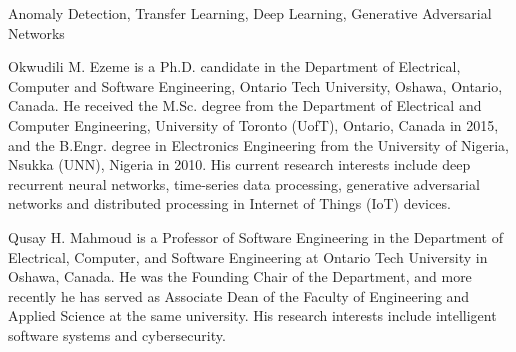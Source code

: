 \documentclass{ieeeaccess}
\begin{document}
\begin{keywords}
Anomaly Detection, Transfer Learning, Deep Learning, Generative Adversarial Networks
\end{keywords}

\titlepgskip=-15pt

\maketitle




\begin{IEEEbiography}{Okwudili M. Ezeme}
	is a Ph.D. candidate in the  Department of Electrical, Computer and Software 
	Engineering, Ontario Tech University, Oshawa,  
	Ontario, Canada. He received the M.Sc. degree from the Department of 
	Electrical and Computer Engineering, University of Toronto (UofT), Ontario, 
	Canada in 2015, and the  B.Engr. degree in Electronics Engineering 
	from the University of Nigeria, Nsukka (UNN), Nigeria in 2010. His current 
	research interests include deep recurrent neural networks, time-series data 
	processing,  generative adversarial networks and distributed processing in Internet of Things (IoT) devices.
\end{IEEEbiography}

\begin{IEEEbiography}{Qusay
		H. Mahmoud}
	is a Professor of Software Engineering in the Department of Electrical, Computer, and Software Engineering at Ontario Tech University in Oshawa, Canada. He was the Founding Chair of the Department, and more recently he has served as Associate Dean of the Faculty of Engineering and Applied Science at the same university. His research interests include intelligent software systems and cybersecurity.
\end{IEEEbiography}
\end{document}
